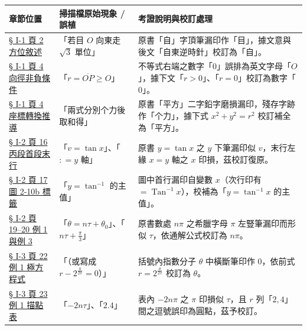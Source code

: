 \documentclass[a4paper,12pt,twoside]{article}
\begin{document}
\begin{table}[H]
\centering
\small
\renewcommand{\arraystretch}{1.35}
\begin{tabularx}{\textwidth}{|p{3.2cm}|p{3.8cm}|X|}
\hline
\textbf{章節位置} & \textbf{掃描檔原始現象 / 誤植} & \textbf{考證說明與校訂處理} \\ \hline

\hyperref[note:b5s-ch1-p2-zi]{§ I-1 頁 2 方位敘述} & 
「若目 $O$ 向東走 $\sqrt{3}$ 單位」 & 
原書「自」字頂筆漏印作「目」，據文意與後文「自東逆時針」校訂為「自」。 \\ \hline

\hyperref[note:b5s-ch1-p4-ge0]{§ I-1 頁 4 向徑非負條件} & 
「$r = \overline{OP} \ge O$」 & 
不等式右端之數字「$0$」誤排為英文字母「$O$」，據下文「$r > 0$」、「$r = 0$」校訂為數字「$0$」。 \\ \hline

\hyperref[note:b5s-ch1-p4-pingfang]{§ I-1 頁 4 座標轉換推導} & 
「兩式分別个力後取和得」 & 
原書「平方」二字鉛字磨損漏印，殘存字跡作「个力」，據下式 $x^2+y^2=r^2$ 校訂補全為「平方」。 \\ \hline

\hyperref[note:b5s-ch1-p16bottom]{§ I-2 頁 16 丙段首段末行} & 
「$v = \tan x$」、「$: = y$ 軸」 & 
原書 $y = \tan x$ 之 $y$ 下筆漏印似 $v$，末行左緣 $x = y$ 軸之 $x$ 印損，茲校訂復原。 \\ \hline

\hyperref[note:b5s-ch1-fig2-10b]{§ I-2 頁 17 圖 2-10b 標籤} & 
「$y = \tan^{-1}$ 的主值」 & 
圖中首行漏印自變數 $x$（次行印有 $= \operatorname{Tan}^{-1} x$），校補為「$y = \tan^{-1} x$ 的主值」。 \\ \hline

\hyperref[note:b5s-ch1-p19pi]{§ I-2 頁 19--20 例 1 與例 3} & 
「$\theta = n\tau + \theta_0$」、「$n\tau + \frac{\pi}{3}$」 & 
原書數處 $n\pi$ 之希臘字母 $\pi$ 左豎筆漏印而形似 $\tau$，依通解公式校訂為 $n\pi$。 \\ \hline

\hyperref[note:b5s-ch1-p22-ex1]{§ I-3 頁 22 例 1 極方程式} & 
「（或寫成 $r - 2^{\frac{0}{2\pi}} = 0$）」 & 
括號內指數分子 $\theta$ 中橫斷筆印作 $0$，依前式 $r = 2^{\frac{\theta}{2\pi}}$ 校訂為 $\theta$。 \\ \hline

\hyperref[note:b5s-ch1-p23-table]{§ I-3 頁 23 例 1 描點表} & 
「$-2n\tau$」、「$2.4$」 & 
表內 $-2n\pi$ 之 $\pi$ 印損似 $\tau$，且 $r$ 列「$2, 4$」間之逗號誤印為圓點，茲予校訂。 \\ \hline


\end{tabularx}
\end{table}
\end{document}
